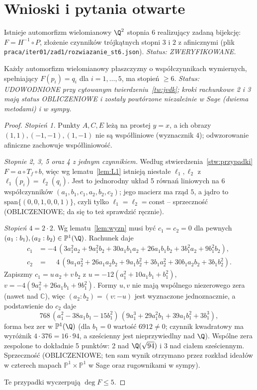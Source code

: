 \section{Wnioski i pytania otwarte}

\begin{twierdzenie}\label{tw:gorne}
Istnieje automorfizm wielomianowy $\Q^2$ stopnia $6$ realizujący zadaną bijekcję:
$F=H^{-1}\circ P$, złożenie czynników trójkątnych stopni $3$ i $2$ z afinicznymi
(plik \texttt{praca/iter01/zad1/rozwiazanie\_st6.json}). \emph{Status: ZWERYFIKOWANE.}
\end{twierdzenie}

\begin{twierdzenie}\label{tw:dolne}
Każdy automorfizm wielomianowy płaszczyzny o współczynnikach wymiernych, spełniający
$F(p_i)=q_i$ dla $i=1,\dots,5$, ma stopień $\ge6$.
\emph{Status: UDOWODNIONE przy cytowanym twierdzeniu~\ref{tw:jvdk}; kroki rachunkowe 2 i 3 mają
status OBLICZENIOWE i zostały powtórzone niezależnie w Sage (dwiema metodami) i w sympy.}
\end{twierdzenie}
\begin{proof}
\emph{Stopień 1.} Punkty $A,C,E$ leżą na prostej $y=x$, a ich obrazy $(1,1),(-1,-1),(1,-1)$ nie są
współliniowe (wyznacznik $4$); odwzorowanie afiniczne zachowuje współliniowość.

\emph{Stopnie 2, 3, 5 oraz 4 z jednym czynnikiem.} Według stwierdzenia~\ref{stw:przypadki}
$F=a\circ T_f\circ b$, więc wg lematu~\ref{lem:L1} istnieją niestałe $\ell_1,\ell_2$ z
$\ell_1(p_i)=\ell_2(q_i)$. Jest to jednorodny układ 5 równań liniowych na 6 współczynników
$(a_1,b_1,c_1,a_2,b_2,c_2)$; jego macierz ma rząd $5$, a jądro to
$\mathrm{span}\{(0,0,1,0,0,1)\}$, czyli tylko $\ell_1=\ell_2=\text{const}$ -- sprzeczność
(OBLICZENIOWE; da się to też sprawdzić ręcznie).

\emph{Stopień $4=2\cdot2$.} Wg lematu~\ref{lem:wyzn} musi być $c_1=c_2=0$ dla pewnych
$(a_1:b_1),(a_2:b_2)\in\mathbb{P}^1(\Q)$. Rachunek daje
\begin{align*}
c_1&=-4\,(3a_1^2a_2+9a_1^2b_2+30a_1b_1a_2+26a_1b_1b_2+3b_1^2a_2+9b_1^2b_2),\\
c_2&=\phantom{-}4\,(9a_1a_2^2+26a_1a_2b_2+9a_1b_2^2+3b_1a_2^2+30b_1a_2b_2+3b_1b_2^2).
\end{align*}
Zapiszmy $c_1=u\,a_2+v\,b_2$ z $u=-12(a_1^2+10a_1b_1+b_1^2)$, $v=-4(9a_1^2+26a_1b_1+9b_1^2)$.
Formy $u,v$ nie mają wspólnego niezerowego zera (nawet nad $\mathbb{C}$), więc $(a_2:b_2)=(v:-u)$ jest
wyznaczone jednoznacznie, a podstawienie do $c_2$ daje
\[
768\,(a_1^2-38a_1b_1-15b_1^2)\,(9a_1^3+29a_1^2b_1+39a_1b_1^2+3b_1^3),
\]
forma bez zer w $\mathbb{P}^1(\Q)$ (dla $b_1=0$ wartość $6912\neq0$; czynnik kwadratowy ma wyróżnik
$4\cdot 376=16\cdot94$, a sześcienny jest nieprzywiedlny nad $\Q$). Wspólne zera zespolone to
dokładnie 5 punktów: 2 nad $\Q(\sqrt{94})$ i 3 nad ciałem sześciennym. Sprzeczność
(OBLICZENIOWE; ten sam wynik otrzymano przez rozkład ideałów w czterech mapach
$\mathbb{P}^1\times\mathbb{P}^1$ w Sage oraz rugownikami w sympy).

Te przypadki wyczerpują $\deg F\le5$.
\end{proof}

